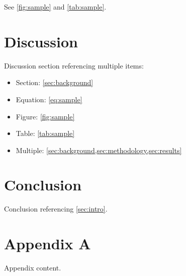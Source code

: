 \documentclass[12pt,a4paper]{article}
\begin{document}
See \cref{fig:sample} and \cref{tab:sample}.

\section{Discussion}\label{sec:discussion}
Discussion section referencing multiple items:
\begin{itemize}
    \item Section: \cref{sec:background}
    \item Equation: \cref{eq:sample}
    \item Figure: \cref{fig:sample}
    \item Table: \cref{tab:sample}
    \item Multiple: \cref{sec:background,sec:methodology,sec:results}
\end{itemize}

\section{Conclusion}\label{sec:conclusion}
Conclusion referencing \cref{sec:intro}.

\appendix
\section{Appendix A}\label{app:a}
Appendix content.
\end{document}
